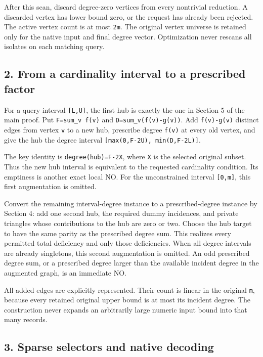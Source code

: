 After this scan, discard degree-zero vertices from every nontrivial reduction. A discarded vertex has lower bound zero, or the request has already been rejected. The active vertex count is at most \texttt{2m}. The original vertex universe is retained only for the native input and final degree vector. Optimization never rescans all isolates on each matching query.

\hypertarget{af-5f2ce72611-from-a-cardinality-interval-to-a-prescribed-factor}{%
\subsection{2. From a cardinality interval to a prescribed factor}\label{af-5f2ce72611-from-a-cardinality-interval-to-a-prescribed-factor}}

For a query interval \texttt{{[}L,U{]}}, the first hub is exactly the one in Section 5 of the main proof. Put \texttt{F=sum\_v\ f(v)} and \texttt{D=sum\_v(f(v)-g(v))}. Add \texttt{f(v)-g(v)} distinct edges from vertex \texttt{v} to a new hub, prescribe degree \texttt{f(v)} at every old vertex, and give the hub the degree interval \texttt{{[}max(0,F-2U),\ min(D,F-2L){]}}.

The key identity is \texttt{degree(hub)=F-2\textbar{}X\textbar{}}, where \texttt{X} is the selected original subset. Thus the new hub interval is equivalent to the requested cardinality condition. Its emptiness is another exact local NO. For the unconstrained interval \texttt{{[}0,m{]}}, this first augmentation is omitted.

Convert the remaining interval-degree instance to a prescribed-degree instance by Section 4: add one second hub, the required dummy incidences, and private triangles whose contributions to the hub are zero or two. Choose the hub target to have the same parity as the prescribed degree sum. This realizes every permitted total deficiency and only those deficiencies. When all degree intervals are already singletons, this second augmentation is omitted. An odd prescribed degree sum, or a prescribed degree larger than the available incident degree in the augmented graph, is an immediate NO.

All added edges are explicitly represented. Their count is linear in the original \texttt{m}, because every retained original upper bound is at most its incident degree. The construction never expands an arbitrarily large numeric input bound into that many records.

\hypertarget{af-5f2ce72611-sparse-selectors-and-native-decoding}{%
\subsection{3. Sparse selectors and native decoding}\label{af-5f2ce72611-sparse-selectors-and-native-decoding}}


